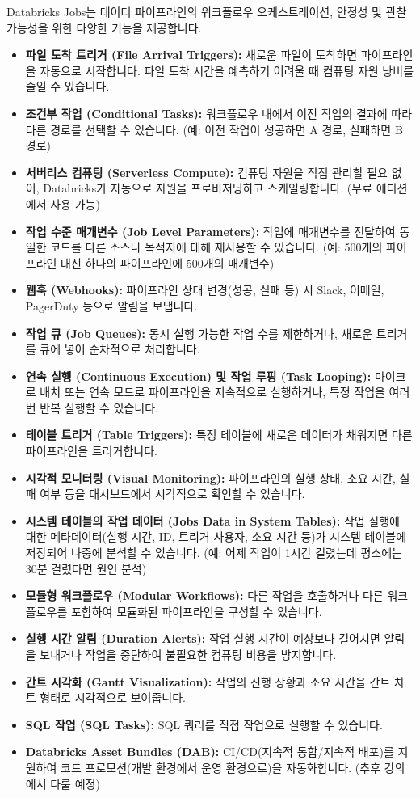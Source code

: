\documentclass[11pt,a4paper]{article}
\theoremstyle{definition}
\begin{document}
Databricks Jobs는 데이터 파이프라인의 워크플로우 오케스트레이션, 안정성 및 관찰 가능성을 위한 다양한 기능을 제공합니다.

\begin{itemize}
    \item \textbf{파일 도착 트리거 (File Arrival Triggers):} 새로운 파일이 도착하면 파이프라인을 자동으로 시작합니다. 파일 도착 시간을 예측하기 어려울 때 컴퓨팅 자원 낭비를 줄일 수 있습니다.
    \item \textbf{조건부 작업 (Conditional Tasks):} 워크플로우 내에서 이전 작업의 결과에 따라 다른 경로를 선택할 수 있습니다. (예: 이전 작업이 성공하면 A 경로, 실패하면 B 경로)
    \item \textbf{서버리스 컴퓨팅 (Serverless Compute):} 컴퓨팅 자원을 직접 관리할 필요 없이, Databricks가 자동으로 자원을 프로비저닝하고 스케일링합니다. (무료 에디션에서 사용 가능)
    \item \textbf{작업 수준 매개변수 (Job Level Parameters):} 작업에 매개변수를 전달하여 동일한 코드를 다른 소스나 목적지에 대해 재사용할 수 있습니다. (예: 500개의 파이프라인 대신 하나의 파이프라인에 500개의 매개변수)
    \item \textbf{웹훅 (Webhooks):} 파이프라인 상태 변경(성공, 실패 등) 시 Slack, 이메일, PagerDuty 등으로 알림을 보냅니다.
    \item \textbf{작업 큐 (Job Queues):} 동시 실행 가능한 작업 수를 제한하거나, 새로운 트리거를 큐에 넣어 순차적으로 처리합니다.
    \item \textbf{연속 실행 (Continuous Execution) 및 작업 루핑 (Task Looping):} 마이크로 배치 또는 연속 모드로 파이프라인을 지속적으로 실행하거나, 특정 작업을 여러 번 반복 실행할 수 있습니다.
    \item \textbf{테이블 트리거 (Table Triggers):} 특정 테이블에 새로운 데이터가 채워지면 다른 파이프라인을 트리거합니다.
    \item \textbf{시각적 모니터링 (Visual Monitoring):} 파이프라인의 실행 상태, 소요 시간, 실패 여부 등을 대시보드에서 시각적으로 확인할 수 있습니다.
    \item \textbf{시스템 테이블의 작업 데이터 (Jobs Data in System Tables):} 작업 실행에 대한 메타데이터(실행 시간, ID, 트리거 사용자, 소요 시간 등)가 시스템 테이블에 저장되어 나중에 분석할 수 있습니다. (예: 어제 작업이 1시간 걸렸는데 평소에는 30분 걸렸다면 원인 분석)
    \item \textbf{모듈형 워크플로우 (Modular Workflows):} 다른 작업을 호출하거나 다른 워크플로우를 포함하여 모듈화된 파이프라인을 구성할 수 있습니다.
    \item \textbf{실행 시간 알림 (Duration Alerts):} 작업 실행 시간이 예상보다 길어지면 알림을 보내거나 작업을 중단하여 불필요한 컴퓨팅 비용을 방지합니다.
    \item \textbf{간트 시각화 (Gantt Visualization):} 작업의 진행 상황과 소요 시간을 간트 차트 형태로 시각적으로 보여줍니다.
    \item \textbf{SQL 작업 (SQL Tasks):} SQL 쿼리를 직접 작업으로 실행할 수 있습니다.
    \item \textbf{Databricks Asset Bundles (DAB):} CI/CD(지속적 통합/지속적 배포)를 지원하여 코드 프로모션(개발 환경에서 운영 환경으로)을 자동화합니다. (추후 강의에서 다룰 예정)
\end{itemize}
\end{document}
